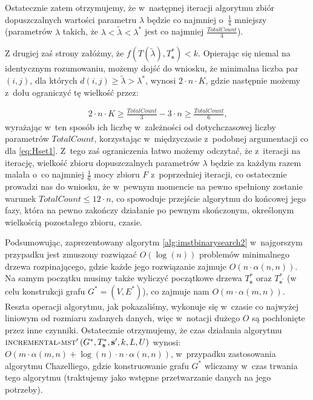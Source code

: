 Ostatecznie zatem otrzymujemy, że w~następnej iteracji algorytmu zbiór dopuszczalnych wartości parametru $\lambda$ będzie co najmniej o~$\frac{1}{4}$ mniejszy (parametrów $\lambda$ takich, że $\lambda < \tilde{\lambda} < \lambda^{\ast}$ jest co najmniej $\frac{TotalCount}{4}$).

Z drugiej zaś strony załóżmy, że $f \left( T \left( \tilde{\lambda} \right), T^{\ast}_{\textbf{s}} \right) < k$. Opierając się niemal na identycznym rozumowaniu, możemy dojść do wniosku, że minimalna liczba par $\left( i, j \right)$, dla których $d \left( i, j \right) \geqslant \tilde{\lambda} > \lambda^{\ast}$, wynosi $2 \cdot n \cdot K$, gdzie następnie możemy z~dołu ograniczyć tę wielkość przez:

\begin{gather*}
	2 \cdot n \cdot K \geqslant \frac{TotalCount}{3} - 3 \cdot n \geqslant \frac{TotalCount}{6}\text{,}
\end{gather*}
wyrażając w~ten sposób ich liczbę w~zależności od dotychczasowej liczby parametrów $TotalCount$, korzystając w~międzyczasie z~podobnej argumentacji co dla \ref{eq:Hset1}. Z~tego zaś ograniczenia łatwo możemy odczytać, że z~iteracji na iterację, wielkość zbioru dopuszczalnych parametrów $\lambda$ będzie za każdym razem malała o~co najmniej $\frac{1}{6}$ mocy zbioru $F$ z~poprzedniej iteracji, co ostatecznie prowadzi nas do wniosku, że w~pewnym momencie na pewno spełniony zostanie warunek $TotalCount \leqslant 12 \cdot n$, co spowoduje przejście algorytmu do końcowej jego fazy, która na pewno zakończy działanie po pewnym skończonym, określonym wielkością pozostałego zbioru, czasie.

Podsumowując, zaprezentowany algorytm \ref{alg:imstbinarysearch2} w~najgorszym przypadku jest zmuszony rozwiązać $O \left( \log \left( n \right) \right)$ problemów minimalnego drzewa rozpinającego, gdzie każde jego rozwiązanie zajmuje $O \left( n \cdot \alpha \left( n, n \right) \right)$. Na samym początku musimy także wyliczyć początkowe drzewa $T^{\ast}_{\textbf{s}}$ oraz $T^{\ast}_{\textbf{s}^{\prime}}$ (w celu konstrukcji grafu $G^{\ast} = \left( V, E^{\ast} \right)$), co zajmuje nam $O \left( m \cdot \alpha  \left( m, n \right) \right)$. Reszta operacji algorytmu, jak pokazaliśmy, wykonuje się w~czasie co najwyżej liniowym od rozmiaru zadanych danych, więc w~notacji dużego $O$ są pochłonięte przez inne czynniki. Ostatecznie otrzymujemy, że czas działania algorytmu $\textsc{incremental-mst}^{\prime} \left( G^{\ast}, T^{\ast}_{\textbf{s}}, \textbf{s}^{\prime}, k, L, U \right)$ wynosi: $O \left( m \cdot \alpha  \left( m, n \right) + \log \left( n \right) \cdot n \cdot \alpha \left( n, n \right) \right)$, w~przypadku zastosowania algorytmu Chazelliego, gdzie konstruowanie grafu $G^{\ast}$ wliczamy w~czas trwania tego algorytmu (traktujemy jako wstępne przetwarzanie danych na jego potrzeby).




